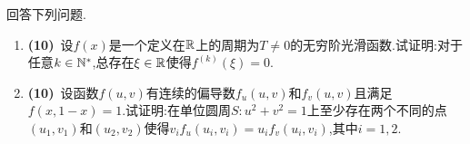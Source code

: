 \documentclass{ctexart}
\begin{document}
\begin{problem}[5.(20\songti{分})]
    回答下列问题.
    \begin{enumerate}[label=\tbf{(\arabic*)}]
        \item \textbf{(10)}\ 设$f(x)$是一个定义在$\mathbb{R}$上的周期为$T\neq0$的无穷阶光滑函数.试证明:对于任意$k\in\mathbb{N}^*$,总存在$\xi\in\mathbb{R}$使得$f^{(k)}(\xi)=0$.
        \item \textbf{(10)}\ 设函数$f(u,v)$有连续的偏导数$f_u(u,v)$和$f_v(u,v)$且满足$f(x,1-x)=1$.试证明:在单位圆周$S:u^2+v^2=1$上至少存在两个不同的点$(u_1,v_1)$和$(u_2,v_2)$使得$v_if_u(u_i,v_i)=u_if_v(u_i,v_i)$,其中$i=1,2$.
    \end{enumerate}
\end{problem}
\end{document}

